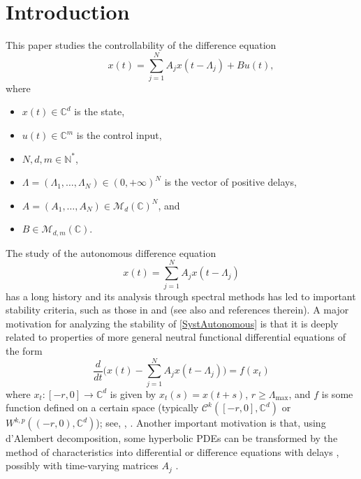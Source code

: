 \section{Introduction}
\label{SecIntro}

This paper studies the controllability of the difference equation\vspace*{-3pt}
\begin{equation}
\label{MainSyst}
\qquad x(t) = \sum_{j=1}^N A_j x(t - \Lambda_j) + B u(t),
\end{equation}
where
\begin{itemize}
\item
$x(t) \in \mathbb C^d$ is the state,
\item
$u(t) \in \mathbb C^m$ is the control input,
\item
$N, d, m \in \mathbb N^\ast$,
\item
$\Lambda = (\Lambda_1, \dots, \Lambda_N) \in (0, +\infty)^N$ is the vector of positive delays,
\item
$A = (A_1, \dots, A_N) \in \mathcal M_d(\mathbb C)^N$, and
\item
$B \in \mathcal M_{d, m}(\mathbb C)$.
\end{itemize}

The study of the autonomous difference equation\vspace*{-3pt}
\begin{equation}
\label{SystAutonomous}
x(t) = \sum_{j=1}^N A_j x(t - \Lambda_j)
\end{equation}
has a long history and its analysis through spectral methods has led to important stability criteria, such as those in \cite{Avellar1980Zeros} and \cite[Chap.\,9]{Hale1993Introduction} (see also \cite{Melvin1974Stability, Cruz1970Stability, Henry1974Linear, Datko1977Linear, Hale1985Stability, Michiels2009Strong} and references therein). A major motivation for analyzing the stability of \eqref{SystAutonomous} is that it is deeply related to properties of more general neutral functional differential equations of the form\vspace*{-3pt}
\begin{equation}
\label{NFDE}
\frac{d}{dt}\biggl(x(t) - \sum_{j=1}^N A_j x(t - \Lambda_j)\biggr) = f(x_t)
\end{equation}
where $x_t: [-r, 0] \to \mathbb C^d$ is given by $x_t(s) = x(t + s)$, $r \geq \Lambda_{\max}$, and $f$ is some function defined on a certain space (typically $\mathcal C^k([-r, 0], \mathbb C^d)$ or $W^{k, p}((-r, 0), \mathbb C^d)$); see, \eg \cite{Cruz1970Stability, Datko1977Linear, Hale1985Stability, Ngoc2015Exponential}, \cite[\S 9.7]{Hale1993Introduction}. Another important motivation is that, using d'Alembert decomposition, some hyperbolic PDEs can be transformed by the method of characteristics into differential or difference equations with delays \cite{Coron2015Dissipative, Coron2008Dissipative, Cooke1968Differential, Fridman2010Bounds, Slemrod1971Nonexistence, Kloss2012Flow}, possibly with time-varying matrices $A_j$ \cite{Chitour2017Persistently, Chitour2016Stability}.

